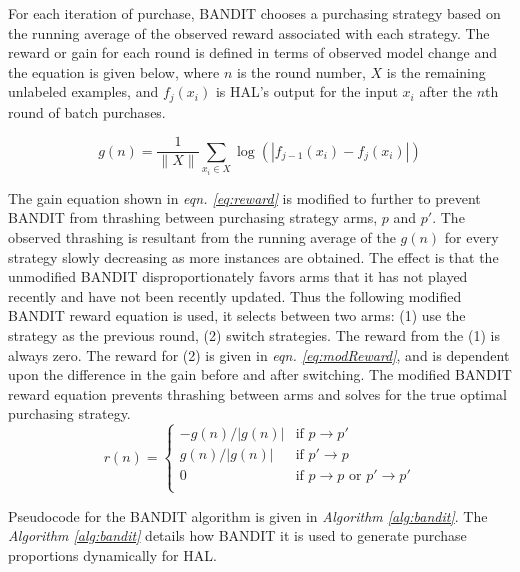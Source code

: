 \documentclass[ms]{nuthesis}
\begin{document}
For each iteration of purchase, BANDIT chooses a purchasing strategy
based on the running average of the observed reward associated with
each strategy. The reward or gain for each round is defined in terms of
observed model change and the equation is given below, where %
$n$ is the round number,
$X$ is the remaining unlabeled examples, and $f_{j}(x_i)$ is HAL's output for the
input $x_i$ after the $n$th round of batch purchases.

\begin{equation}
\label{eq:reward}
g(n) = \frac{1}{\|X\|}\sum_{x_i \in X} \log{(|f_{j-1}(x_i) - f_{j}(x_i)|)}
\end{equation}

The gain equation shown in \textit{eqn. \ref{eq:reward}} is modified to further
to prevent BANDIT from thrashing between purchasing strategy arms, $p$ and $p'$.
The observed thrashing is resultant from the running average of the $g(n)$
for every strategy slowly decreasing as more instances are obtained. The effect is
 that the unmodified BANDIT disproportionately favors arms that it has not played
  recently and have not been recently updated.
  Thus the following modified
  BANDIT reward equation is used, it selects between two arms: (1) use the
  strategy as the previous round, (2) switch strategies. The reward from the
  (1) is always zero. The reward for (2) is given in
  \textit{eqn. \ref{eq:modReward}}, and is dependent upon the difference
  in the gain before and after switching.
  The modified BANDIT reward
  equation prevents thrashing between arms and solves for the true optimal
  purchasing strategy.
\begin{equation}
\label{eq:modReward}
    r(n)=
\begin{cases}
   -g(n)/|g(n)| & \text{if } p \rightarrow p'\\
    g(n)/|g(n)| & \text{if } p' \rightarrow p\\
    0 & \text{if }  p \rightarrow  p \text{ or }  p' \rightarrow p' \\
\end{cases}
\end{equation}

Pseudocode for the BANDIT algorithm is given in \textit{Algorithm \ref{alg:bandit}}. The
\textit{Algorithm \ref{alg:bandit}} details how BANDIT it is used to generate
purchase proportions dynamically for HAL.
\end{document}

